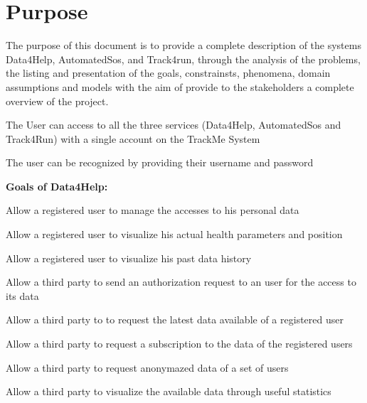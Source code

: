 \section{Purpose}
The purpose of this document is to provide a complete description of the systems Data4Help, AutomatedSos, and Track4run, through the analysis of the problems, the listing and presentation of the goals, constrainsts, phenomena, domain assumptions and models with the aim of provide to the stakeholders a complete overview of the project.

\begin{goalList}
\begin{enumerate}[label={[}G\arabic*{]}]

    \item \label{goal:trackme1} The User can access to all the three services (Data4Help,     AutomatedSos and Track4Run) with a single account on the TrackMe System
    \item \label{goal:trackme2}The user can be recognized by providing their username and     password
    \newline
    
\end{enumerate}

\textbf{Goals of Data4Help:}
\begin{enumerate}[label={[}G3.\arabic*{]}]

    \item \label{goal:user1} Allow a registered user to manage the accesses to his personal     data
    \item \label{goal:user2}Allow a registered user to visualize his actual health     parameters and position
    \item \label{goal:user3}Allow a registered user to visualize his past data history
    \item \label{goal:parties1}Allow a third party to send an authorization request to an     user for the access to its data
    \item \label{goal:parties2}Allow a third party to to request the latest data available     of a registered user
    \item \label{goal:parties3}Allow a third party to request a subscription to the data of     the registered users
    \item \label{goal:parties4}Allow a third party to request anonymazed data of a set of     users 
    \item \label{goal:parties5}Allow a third party to visualize the available data through     useful statistics 
    \newline
    

\end{enumerate}
\end{goalList}
